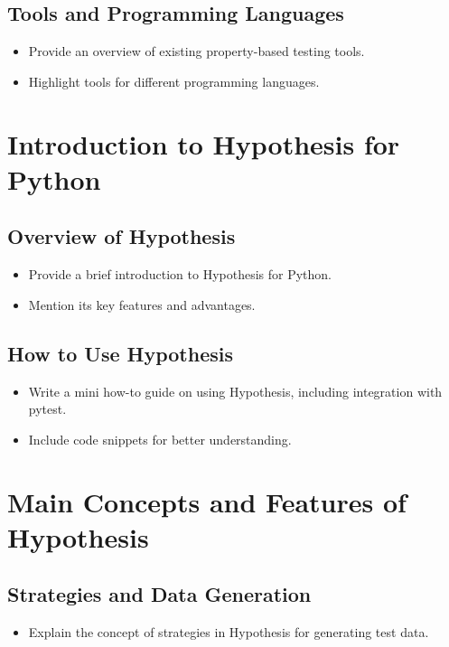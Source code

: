 \documentclass[runningheads]{llncs}
\begin{document}
\subsection{Tools and Programming Languages}
\begin{itemize}
  \item Provide an overview of existing property-based testing tools.
  \item Highlight tools for different programming languages.
\end{itemize}

\section{Introduction to Hypothesis for Python}
\subsection{Overview of Hypothesis}
\begin{itemize}
  \item Provide a brief introduction to Hypothesis for Python.
  \item Mention its key features and advantages.
\end{itemize}

\subsection{How to Use Hypothesis}
\begin{itemize}
  \item Write a mini how-to guide on using Hypothesis, including integration with pytest.
  \item Include code snippets for better understanding.
\end{itemize}

\section{Main Concepts and Features of Hypothesis}
\subsection{Strategies and Data Generation}
\begin{itemize}
  \item Explain the concept of strategies in Hypothesis for generating test data.
\end{itemize}
\end{document}

